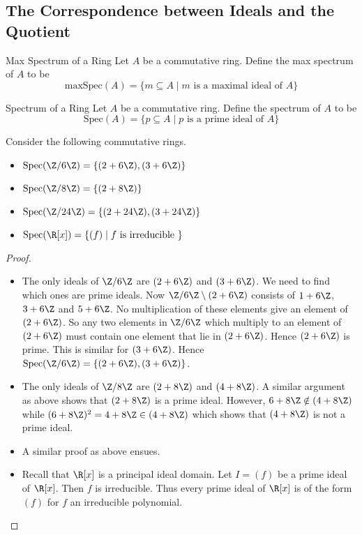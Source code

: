 \documentclass[a4paper]{article}
\begin{document}
\subsection{The Correspondence between Ideals and the Quotient}
\begin{defn}{Max Spectrum of a Ring}{} Let $A$ be a commutative ring. Define the max spectrum of $A$ to be $$\text{maxSpec}(A)=\{m\subseteq A\;|\;m\text{ is a maximal ideal of }A\}$$
\end{defn}

\begin{defn}{Spectrum of a Ring}{} Let $A$ be a commutative ring. Define the spectrum of $A$ to be $$\text{Spec}(A)=\{p\subseteq A\;|\;p\text{ is a prime ideal of }A\}$$
\end{defn}

\begin{eg}{}{} Consider the following commutative rings. 
\begin{itemize}
\item $\text{Spec}(\Z/6\Z)=\{(2+6\Z),(3+6\Z)\}$
\item $\text{Spec}(\Z/8\Z)=\{(2+8\Z)\}$
\item $\text{Spec}(\Z/24\Z)=\{(2+24\Z),(3+24\Z)\}$
\item $\text{Spec}(\R[x])=\{(f)\;|\;f\text{ is irreducible }\}$
\end{itemize} \tcbline
\begin{proof}~\\
\begin{itemize}
\item The only ideals of $\Z/6\Z$ are $(2+6\Z)$ and $(3+6\Z)$. We need to find which ones are prime ideals. Now $\Z/6\Z\setminus(2+6\Z)$ consists of $1+6\Z$, $3+6\Z$ and $5+6\Z$. No multiplication of these elements give an element of $(2+6\Z)$. So any two elements in $\Z/6\Z$ which multiply to an element of $(2+6\Z)$ must contain one element that lie in $(2+6\Z)$. Hence $(2+6\Z)$ is prime. This is similar for $(3+6\Z)$. Hence $\text{Spec}(\Z/6\Z)=\{(2+6\Z),(3+6\Z)\}$. 
\item The only ideals of $\Z/8\Z$ are $(2+8\Z)$ and $(4+8\Z)$. A similar argument as above shows that $(2+8\Z)$ is a prime ideal. However, $6+8\Z\notin(4+8\Z)$ while $(6+8\Z)^2=4+8\Z\in(4+8\Z)$ which shows that $(4+8\Z)$ is not a prime ideal. 
\item A similar proof as above ensues. 
\item Recall that $\R[x]$ is a principal ideal domain. Let $I=(f)$ be a prime ideal of $\R[x]$. Then $f$ is irreducible. Thus every prime ideal of $\R[x]$ is of the form $(f)$ for $f$ an irreducible polynomial. 
\end{itemize}
\end{proof}
\end{eg}
\end{document}
